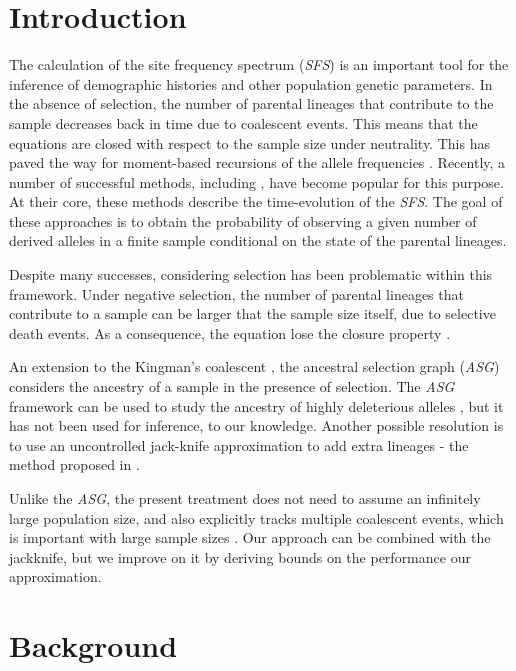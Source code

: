 \documentclass[review]{elsarticle}
\begin{document}
\section{Introduction}
\label{sec:introduciton}

The calculation of the site frequency spectrum (\textit{SFS}) is an important tool for the inference
of demographic histories and other population genetic parameters. In the absence of selection, the
number of parental lineages that contribute to the sample decreases back in time due to coalescent
events. This means that the equations are closed with respect to the sample size under neutrality.
This has paved the way for moment-based recursions of the allele frequencies
\cite{KimuraCrow1964,Ewens1972,DonnellyKurtz1999}. Recently, a number of successful methods,
including \cite{GutenkunstEtAl2009,JouganousEtAl2017,KammEtAl2017}, have become popular for this
purpose. At their core, these methods describe the time-evolution of the \textit{SFS}. The goal of
these approaches is to obtain the probability of observing a given number of derived alleles in a
finite sample conditional on the state of the parental lineages.

Despite many successes, considering selection has been problematic within this framework. Under
negative selection, the number of parental lineages that contribute to a sample can be larger that
the sample size itself, due to selective death events. As a consequence, the equation lose the
closure property \cite{JouganousEtAl2017}.

An extension to the Kingman's coalescent \cite{Kingman1982a}, the ancestral selection graph
(\textit{ASG}) \cite{KroneNeuhauser1997} considers the ancestry of a sample in the presence of
selection. The \textit{ASG} framework can be used to study the ancestry of highly deleterious
alleles \cite{Wakeley2009}, but it has not been used for inference, to our knowledge. Another
possible resolution is to use an uncontrolled jack-knife approximation to add extra lineages - the
method proposed in \cite{JouganousEtAl2017}.

Unlike the \textit{ASG}, the present treatment does not need to assume an infinitely large
population size, and also explicitly tracks multiple coalescent events, which is important with
large sample sizes \cite{BhaskarEtAl2014}. Our approach can be combined with the jackknife, but we
improve on it by deriving bounds on the performance our approximation.

\section{Background}
\label{sec:background}
\end{document}
